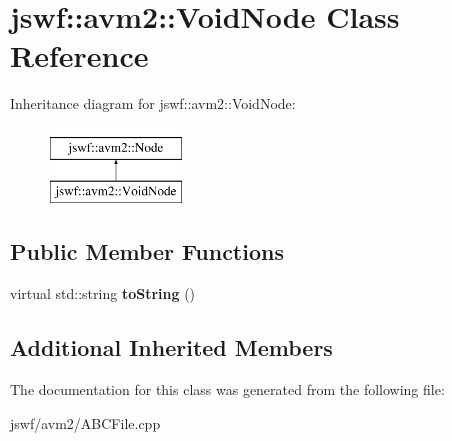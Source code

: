 \hypertarget{classjswf_1_1avm2_1_1_void_node}{\section{jswf\+:\+:avm2\+:\+:Void\+Node Class Reference}
\label{classjswf_1_1avm2_1_1_void_node}
}
Inheritance diagram for jswf\+:\+:avm2\+:\+:Void\+Node\+:\begin{figure}[H]
\begin{center}
\leavevmode
\includegraphics[height=2.000000cm]{classjswf_1_1avm2_1_1_void_node}
\end{center}
\end{figure}
\subsection*{Public Member Functions}
\begin{DoxyCompactItemize}
\item 
\hypertarget{classjswf_1_1avm2_1_1_void_node_a7691b803316578dde7f5b027bee1b3aa}{virtual std\+::string {\bfseries to\+String} ()}\label{classjswf_1_1avm2_1_1_void_node_a7691b803316578dde7f5b027bee1b3aa}

\end{DoxyCompactItemize}
\subsection*{Additional Inherited Members}


The documentation for this class was generated from the following file\+:\begin{DoxyCompactItemize}
\item 
jswf/avm2/A\+B\+C\+File.\+cpp\end{DoxyCompactItemize}
